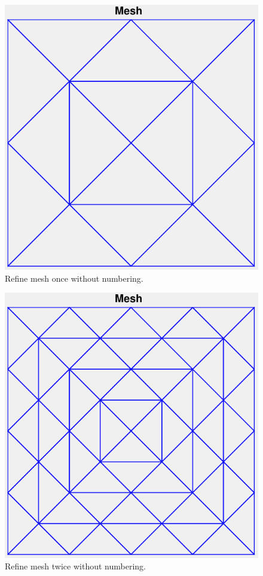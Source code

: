 \documentclass[11pt,a4paper,center,notitlepage]{article}
\numberwithin{equation}{section}
\begin{document}
\begin{figure}[H]
\centering
\includegraphics[scale=0.9]{2}
\caption{Refine mesh once without numbering.}
\label{fig13}
\end{figure}

\begin{figure}[H]
\centering
\includegraphics[scale=0.9]{3}
\caption{Refine mesh twice without numbering.}
\label{fig14}
\end{figure}
\end{document}
